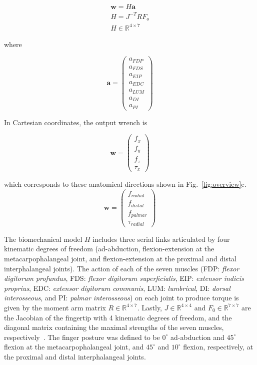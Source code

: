 \documentclass[9pt,twocolumn,twoside,lineno]{pnas-new}
\begin{document}
{\begin{eqnarray}
\textbf{w} = H \textbf{a} \\
H=J^{-T}RF_o \\
H \in \mathbb{R}^{4 \times 7}
\end{eqnarray}

where

\begin{equation}
\label{eq:a}
\textbf{a}=
\begin{pmatrix}
a_{FDP}\\
a_{FDS}\\
a_{EIP}\\
a_{EDC}\\
a_{LUM}\\
a_{DI}\\
a_{PI}
\end{pmatrix}
\end{equation}

In Cartesian coordinates, the output wrench is

\begin{equation}
\label{eq:wc}
\textbf{w}=
\begin{pmatrix}
f_{x}\\
f_{y}\\
f_{z}\\
\tau_{x}
\end{pmatrix}
\end{equation}

which corresponds to these anatomical directions shown in Fig.~\ref{fig:overview}e.
\begin{equation}
\label{eq:wa}
\textbf{w}=
\begin{pmatrix}
f_{radial}\\
f_{distal}\\
f_{palmar}\\
\tau_{radial}
\end{pmatrix}
\end{equation}

The biomechanical model $H$ includes three serial links articulated by four kinematic degrees of freedom (ad-abduction, flexion-extension at the metacarpophalangeal joint, and flexion-extension at the proximal and distal interphalangeal joints). The action of each of the seven muscles (FDP: \emph{flexor digitorum profundus}, FDS: \emph{flexor digitorum superficialis}, EIP: \emph{extensor indicis proprius}, EDC: \emph{extensor digitorum communis}, LUM: \emph{lumbrical}, DI: \emph{dorsal interosseous}, and PI: \emph{palmar interosseous}) on each joint to produce torque is given by the moment arm matrix $R \in \mathbb{R}^{4 \times 7}$. Lastly, $J \in \mathbb{R}^{4 \times 4}$ and $F_0 \in \mathbb{R}^{7 \times 7}$ are the Jacobian of the fingertip with 4 kinematic degrees of freedom, and the diagonal matrix containing the maximal strengths of the seven muscles, respectively~\cite{valero-cuevas2015fundamentals,Valero-Cuevas2000Scaling}. The finger posture was defined to be $0^\circ$ ad-abduction and $45^\circ$ flexion at the metacarpophalangeal joint, and $45^\circ$ and $10^\circ$ flexion, respectively, at the proximal and distal interphalangeal joints.

}
\end{document}
